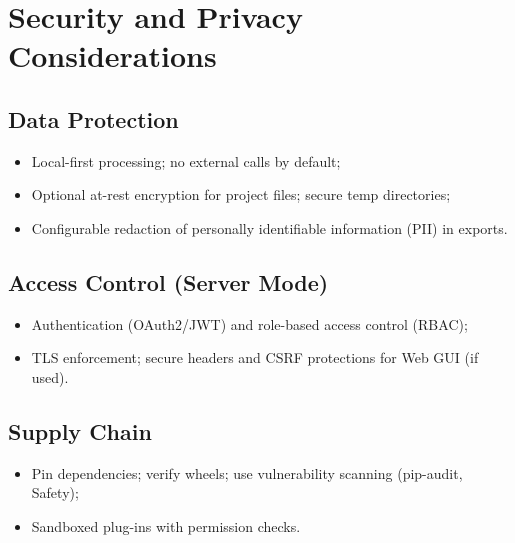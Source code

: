 \section{Security and Privacy Considerations}
\subsection{Data Protection}
\begin{itemize}
    \item Local-first processing; no external calls by default;
    \item Optional at-rest encryption for project files; secure temp directories;
    \item Configurable redaction of personally identifiable information (PII) in exports.
\end{itemize}

\subsection{Access Control (Server Mode)}
\begin{itemize}
    \item Authentication (OAuth2/JWT) and role-based access control (RBAC);
    \item TLS enforcement; secure headers and CSRF protections for Web GUI (if used).
\end{itemize}

\subsection{Supply Chain}
\begin{itemize}
    \item Pin dependencies; verify wheels; use vulnerability scanning (pip-audit, Safety);
    \item Sandboxed plug-ins with permission checks.
\end{itemize}

